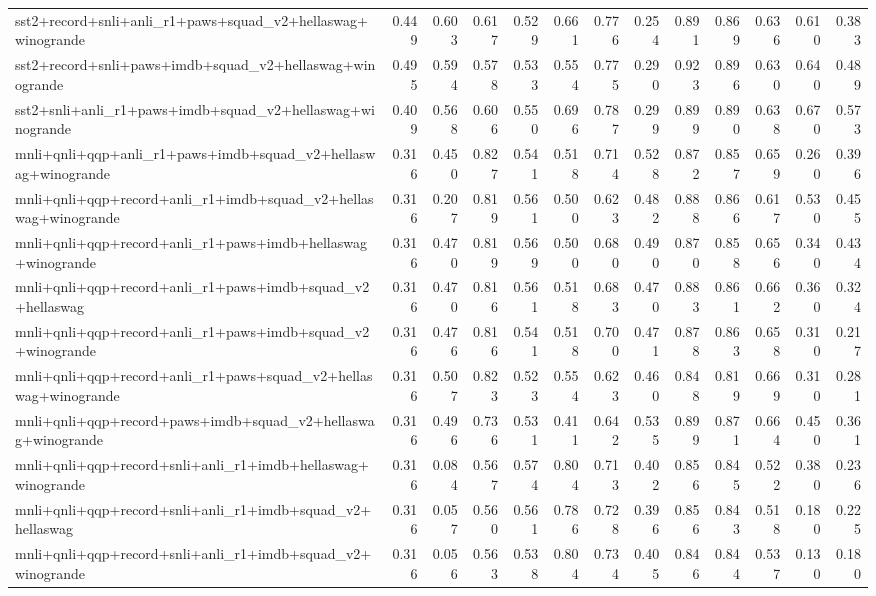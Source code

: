 \begin{table}[t]
\begin{tabular}{lrrrrrrrrrrrr}
    sst2+record+snli+anli\_r1+paws+squad\_v2+hellaswag+winogrande & 0.449 & 0.603 & 0.617 & 0.529 & 0.661 & 0.776 & 0.254 & 0.891 & 0.869 & 0.636 & 0.610 & 0.383 \\
    sst2+record+snli+paws+imdb+squad\_v2+hellaswag+winogrande & 0.495 & 0.594 & 0.578 & 0.533 & 0.554 & 0.775 & 0.290 & 0.923 & 0.896 & 0.630 & 0.640 & 0.489 \\
    sst2+snli+anli\_r1+paws+imdb+squad\_v2+hellaswag+winogrande & 0.409 & 0.568 & 0.606 & 0.550 & 0.696 & 0.787 & 0.299 & 0.899 & 0.890 & 0.638 & 0.670 & 0.573 \\
    \addlinespace
    mnli+qnli+qqp+anli\_r1+paws+imdb+squad\_v2+hellaswag+winogrande & 0.316 & 0.450 & 0.827 & 0.541 & 0.518 & 0.714 & 0.528 & 0.872 & 0.857 & 0.659 & 0.260 & 0.396 \\
    mnli+qnli+qqp+record+anli\_r1+imdb+squad\_v2+hellaswag+winogrande & 0.316 & 0.207 & 0.819 & 0.561 & 0.500 & 0.623 & 0.482 & 0.888 & 0.866 & 0.617 & 0.530 & 0.455 \\
    mnli+qnli+qqp+record+anli\_r1+paws+imdb+hellaswag+winogrande & 0.316 & 0.470 & 0.819 & 0.569 & 0.500 & 0.680 & 0.490 & 0.870 & 0.858 & 0.656 & 0.340 & 0.434 \\
    mnli+qnli+qqp+record+anli\_r1+paws+imdb+squad\_v2+hellaswag & 0.316 & 0.470 & 0.816 & 0.561 & 0.518 & 0.683 & 0.470 & 0.883 & 0.861 & 0.662 & 0.360 & 0.324 \\
    mnli+qnli+qqp+record+anli\_r1+paws+imdb+squad\_v2+winogrande & 0.316 & 0.476 & 0.816 & 0.541 & 0.518 & 0.700 & 0.471 & 0.878 & 0.863 & 0.658 & 0.310 & 0.217 \\
    mnli+qnli+qqp+record+anli\_r1+paws+squad\_v2+hellaswag+winogrande & 0.316 & 0.507 & 0.823 & 0.523 & 0.554 & 0.623 & 0.460 & 0.848 & 0.819 & 0.669 & 0.310 & 0.281 \\
    mnli+qnli+qqp+record+paws+imdb+squad\_v2+hellaswag+winogrande & 0.316 & 0.496 & 0.736 & 0.531 & 0.411 & 0.642 & 0.535 & 0.899 & 0.871 & 0.664 & 0.450 & 0.361 \\
    mnli+qnli+qqp+record+snli+anli\_r1+imdb+hellaswag+winogrande & 0.316 & 0.084 & 0.567 & 0.574 & 0.804 & 0.713 & 0.402 & 0.856 & 0.845 & 0.522 & 0.380 & 0.236 \\
    mnli+qnli+qqp+record+snli+anli\_r1+imdb+squad\_v2+hellaswag & 0.316 & 0.057 & 0.560 & 0.561 & 0.786 & 0.728 & 0.396 & 0.856 & 0.843 & 0.518 & 0.180 & 0.225 \\
    mnli+qnli+qqp+record+snli+anli\_r1+imdb+squad\_v2+winogrande & 0.316 & 0.056 & 0.563 & 0.538 & 0.804 & 0.734 & 0.405 & 0.846 & 0.844 & 0.537 & 0.130 & 0.180 \\

\end{tabular}
\end{table}
